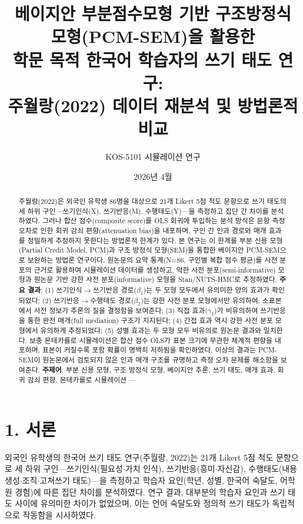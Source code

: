 \documentclass[a4paper,10pt]{oblivoir}
\title{베이지안 부분점수모형 기반 구조방정식 모형(PCM-SEM)을 활용한\\
학문 목적 한국어 학습자의 쓰기 태도 연구:\\
주월랑(2022) 데이터 재분석 및 방법론적 비교}
\author{KOS-5101 시뮬레이션 연구}
\date{2026년 4월}
\begin{document}
\maketitle

\begin{abstract}
주월랑(2022)은 외국인 유학생 86명을 대상으로 21개 Likert 5점 척도 문항으로 쓰기 태도의 세 하위 구인—쓰기인식(X), 쓰기반응(M), 수행태도(Y)—을 측정하고 집단 간 차이를 분석하였다. 그러나 합산 점수(composite score)를 OLS 회귀에 투입하는 분석 방식은 문항 측정 오차로 인한 회귀 감쇠 편향(attenuation bias)을 내포하며, 구인 간 인과 경로와 매개 효과를 정밀하게 추정하지 못한다는 방법론적 한계가 있다. 본 연구는 이 한계를 부분 신용 모형(Partial Credit Model, PCM)과 구조 방정식 모형(SEM)을 통합한 베이지안 PCM-SEM으로 보완하는 방법론 연구이다.
원논문의 요약 통계(N=86, 구인별 복합 점수 평균)를 사전 분포의 근거로 활용하여 시뮬레이션 데이터를 생성하고, 약한 사전 분포(semi-informative) 모형과 원논문 기반 강한 사전 분포(informative) 모형을 Stan/NUTS-HMC로 추정하였다. \textbf{주요 결과}: (1) 쓰기인식\ensuremath{\rightarrow}쓰기반응 경로($\beta_1$)는 두 모형 모두에서 유의미한 양의 효과가 확인되었다; (2) 쓰기반응\ensuremath{\rightarrow}수행태도 경로($\beta_2$)는 강한 사전 분포 모형에서만 유의하여, 소표본에서 사전 정보가 추론의 질을 결정함을 보여준다; (3) 직접 효과($\gamma_1$)가 비유의하여 쓰기반응을 통한 완전 매개(full mediation) 구조가 지지된다; (4) 간접 효과 역시 강한 사전 분포 모형에서 유의하게 추정되었다; (5) 성별 효과는 두 모형 모두 비유의로 원논문 결과와 일치한다. 보충 몬테카를로 시뮬레이션은 합산 점수 OLS가 표본 크기에 무관한 체계적 편향을 내포하며, 표본이 커질수록 포함 확률이 명백히 저하됨을 확인하였다. 이상의 결과는 PCM-SEM이 원논문에서 검토되지 않은 인과 매개 구조를 규명하고 측정 오차 문제를 해소함을 보여준다.
\textbf{주제어}: 부분 신용 모형, 구조 방정식 모형, 베이지안 추론, 쓰기 태도, 매개 효과, 회귀 감쇠 편향, 몬테카를로 시뮬레이션
---
\end{abstract}
\section{1. 서론}

외국인 유학생의 한국어 쓰기 태도 연구(주월랑, 2022)는 21개 Likert 5점 척도 문항으로 세 하위 구인—쓰기인식(필요성\ensuremath{\cdot}가치 인식), 쓰기반응(흥미\ensuremath{\cdot}자신감), 수행태도(내용 생성\ensuremath{\cdot}조직\ensuremath{\cdot}고쳐쓰기 태도)—을 측정하고 학습자 요인(학년, 성별, 한국어 숙달도, 어학원 경험)에 따른 집단 차이를 분석하였다. 연구 결과, 대부분의 학습자 요인과 쓰기 태도 사이에 유의미한 차이가 없었으며, 이는 언어 숙달도와 정의적 쓰기 태도가 독립적으로 작동함을 시사하였다.
\end{document}

